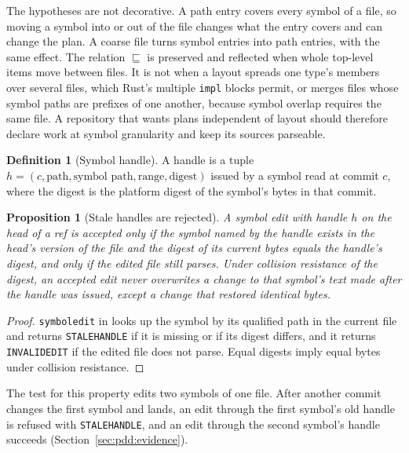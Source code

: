 \documentclass[11pt,letterpaper]{article}
\newtheorem{proposition}[theorem]{Proposition}
\theoremstyle{definition}
\newtheorem{definition}[theorem]{Definition}
\theoremstyle{remark}
\DeclareRobustCommand{\code}[1]{{\def\_{\textunderscore\allowbreak}\texttt{#1}}}
\begin{document}
The hypotheses are not decorative. A path entry covers every symbol of a file, so moving a symbol into or out of the file changes what the entry covers and can change the plan. A coarse file turns symbol entries into path entries, with the same effect. The relation $\sqsubseteq$ is preserved and reflected when whole top-level items move between files. It is not when a layout spreads one type's members over several files, which Rust's multiple \code{impl} blocks permit, or merges files whose symbol paths are prefixes of one another, because symbol overlap requires the same file. A repository that wants plans independent of layout should therefore declare work at symbol granularity and keep its sources parseable.

\begin{definition}[Symbol handle]
\label{def:pdd:handle}
A handle is a tuple $h=(c,\text{path},\text{symbol path},\text{range},\text{digest})$ issued by a symbol read at commit $c$, where the digest is the platform digest of the symbol's bytes in that commit.
\end{definition}

\begin{proposition}[Stale handles are rejected]
\label{prop:pdd:stale}
A symbol edit with handle $h$ on the head of a ref is accepted only if the symbol named by the handle exists in the head's version of the file and the digest of its current bytes equals the handle's digest, and only if the edited file still parses. Under collision resistance of the digest, an accepted edit never overwrites a change to that symbol's text made after the handle was issued, except a change that restored identical bytes.
\end{proposition}

\begin{proof}
\code{symbol\_edit} in  looks up the symbol by its qualified path in the current file and returns \code{STALE\_HANDLE} if it is missing or if its digest differs, and it returns \code{INVALID\_EDIT} if the edited file does not parse. Equal digests imply equal bytes under collision resistance.
\end{proof}

The test for this property edits two symbols of one file. After another commit changes the first symbol and lands, an edit through the first symbol's old handle is refused with \code{STALE\_HANDLE}, and an edit through the second symbol's handle succeeds (Section~\ref{sec:pdd:evidence}).
\end{document}
